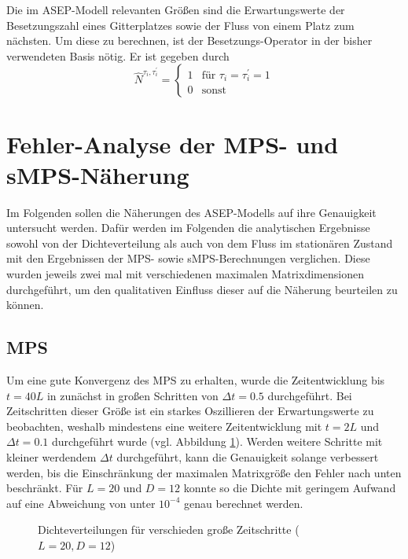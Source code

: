 \documentclass[10pt,a4paper]{report}
\begin{document}
Die im ASEP-Modell relevanten Größen sind die Erwartungswerte der Besetzungszahl eines Gitterplatzes sowie der Fluss von einem Platz zum nächsten. Um diese zu berechnen, ist der Besetzungs-Operator in der bisher verwendeten Basis nötig. Er ist gegeben durch
\begin{equation}
\hat{N}^{\tau_i,\tau_i^{\prime}}=
\begin{cases}
1&\text{für }\tau_i=\tau_i^{\prime}=1\\
0&\text{sonst}
\end{cases}
\end{equation}

\section{Fehler-Analyse der MPS- und sMPS-Näherung}


Im Folgenden sollen die Näherungen des ASEP-Modells auf ihre Genauigkeit untersucht werden. Dafür werden im Folgenden die analytischen Ergebnisse sowohl von der Dichteverteilung als auch von dem Fluss im stationären Zustand mit den Ergebnissen der MPS- sowie sMPS-Berechnungen verglichen. Diese wurden jeweils zwei mal mit verschiedenen maximalen Matrixdimensionen durchgeführt, um den qualitativen Einfluss dieser auf die Näherung beurteilen zu können.

\subsection{MPS}\label{ASEP_MPS}


Um eine gute Konvergenz des MPS zu erhalten, wurde die Zeitentwicklung bis $t=40L$ in zunächst in großen Schritten von $\Delta t=0.5$ durchgeführt. Bei Zeitschritten dieser Größe ist ein starkes Oszillieren der Erwartungswerte zu beobachten, weshalb mindestens eine weitere Zeitentwicklung mit $t=2L$ und $\Delta t=0.1$ durchgeführt wurde (vgl. Abbildung \ref{tMPS_time_error_img}). Werden weitere Schritte mit kleiner werdendem $\Delta t$ durchgeführt, kann die Genauigkeit solange verbessert werden, bis die Einschränkung der maximalen Matrixgröße den Fehler nach unten beschränkt. Für $L=20$ und $D=12$ konnte so die Dichte mit geringem Aufwand auf eine Abweichung von unter $10^{-4}$ genau berechnet werden.

\begin{figure}\label{tMPS_time_error_img}
\centering
{}
\caption{Dichteverteilungen für verschieden große Zeitschritte ($L=20,D=12$)}
\end{figure}
\end{document}
